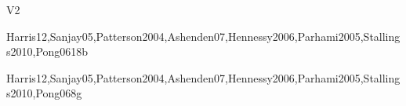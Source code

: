 \begin{syllabus}
\begin{competences}{V2}
    \item {} 
    \item {}
    \item {}
\end{competences}

\begin{unit}{\ARDigitallogicanddigitalsystems}{}{Harris12,Sanjay05,Patterson2004,Ashenden07,Hennessy2006,Parhami2005,Stallings2010,Pong06}{18}{b}
\begin{topics}%
\item \ARDigitallogicanddigitalsystemsTopicOverview
\item \ARDigitallogicanddigitalsystemsTopicCombinational
\item \ARDigitallogicanddigitalsystemsTopicMultiple
\item \ARDigitallogicanddigitalsystemsTopicComputer
\item \ARDigitallogicanddigitalsystemsTopicRegister
\item \ARDigitallogicanddigitalsystemsTopicPhysical
\end{topics}
\begin{learningoutcomes}
\item \ARDigitallogicanddigitalsystemsLODescribeTheComputer [\Familiarity]
\item \ARDigitallogicanddigitalsystemsLOComprehend [\Usage]
\item \ARDigitallogicanddigitalsystemsLOExplainTheThe [\Usage]
\item \ARDigitallogicanddigitalsystemsLOArticulate [\Familiarity]
\item \ARDigitallogicanddigitalsystemsLODesignThe [\Usage]
\item \ARDigitallogicanddigitalsystemsLOUseCad [\Familiarity]
\item \ARDigitallogicanddigitalsystemsLOEvaluate [\Assessment]
\end{learningoutcomes}
\end{unit}

\begin{unit}{\ARMachinelevelrepresentationofdata}{}{Harris12,Sanjay05,Patterson2004,Ashenden07,Hennessy2006,Parhami2005,Stallings2010,Pong06}{8}{g}
\begin{topics}
\item \ARMachinelevelrepresentationofdataTopicBits
\item \ARMachinelevelrepresentationofdataTopicNumeric
\item \ARMachinelevelrepresentationofdataTopicFixed
\item \ARMachinelevelrepresentationofdataTopicSigned
\item \ARMachinelevelrepresentationofdataTopicRepresentation
\item \ARMachinelevelrepresentationofdataTopicRepresentationOf
\end{topics}


\end{unit}
\end{syllabus}
